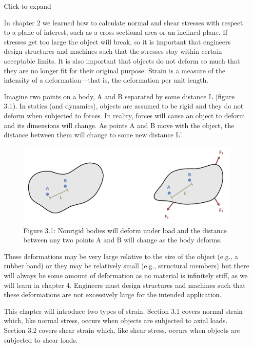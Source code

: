 \documentclass[
  letterpaper,
  DIV=11,
  numbers=noendperiod]{scrreprt}
\begin{document}

Click to expand

In chapter 2 we learned how to calculate normal and shear stresses with
respect to a plane of interest, such as a cross-sectional area or an
inclined plane. If stresses get too large the object will break, so it
is important that engineers design structures and machines such that the
stresses stay within certain acceptable limits. It is also important
that objects do not deform so much that they are no longer fit for their
original purpose. Strain is a measure of the intensity of a
deformation---that is, the deformation per unit length.

Imagine two points on a body, A and B separated by some distance L
(figure 3.1). In statics (and dynamics), objects are assumed to be rigid
and they do not deform when subjected to forces. In reality, forces will
cause an object to deform and its dimensions will change. As points A
and B move with the object, the distance between them will change to
some new distance L'.

\begin{figure}[H]

{\centering \includegraphics{images/CH3 PNGs/figure 3.1.png}

}

\caption{Figure 3.1: Nonrigid bodies will deform under load and the
distance between any two points A and B will change as the body
deforms.}

\end{figure}%

These deformations may be very large relative to the size of the object
(e.g., a rubber band) or they may be relatively small (e.g., structural
members) but there will always be some amount of deformation as no
material is infinitely stiff, as we will learn in chapter 4. Engineers
must design structures and machines such that these deformations are not
excessively large for the intended application.

This chapter will introduce two types of strain. Section 3.1 covers
normal strain which, like normal stress, occurs when objects are
subjected to axial loads. Section 3.2 covers shear strain which, like
shear stress, occurs when objects are subjected to shear loads.
\end{document}
